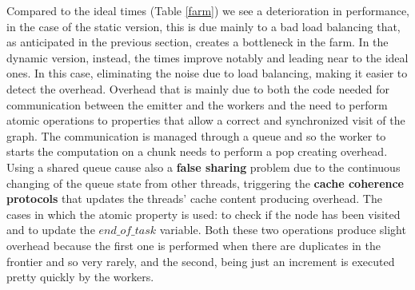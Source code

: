 Compared to the ideal times (Table \ref{farm}) we see a deterioration in performance, 
in the case of the static version, this is due mainly to a bad load balancing that, as anticipated in the previous section, creates a bottleneck in the farm. In the dynamic version, instead, the times improve notably and leading near to the ideal ones. In this case, eliminating the noise due to load balancing, making it easier to detect the overhead. Overhead that is mainly due to both the code needed for communication between the emitter and the workers and the need to perform atomic operations to properties that allow a correct and synchronized visit of the graph. The communication is managed through a queue and so the worker to starts the computation on a chunk needs to perform a pop creating overhead. Using a shared queue cause also a \textbf{false sharing} problem due to the continuous changing of the queue state from other threads, triggering the \textbf{cache coherence protocols} that updates the threads' cache content producing overhead. 
The cases in which the atomic property is used: to check if the node has been visited and to update the $end\_of\_task$ variable. Both these two operations produce slight overhead because the first one is performed when there are duplicates in the frontier and so very rarely, and the second, being just an increment is executed pretty quickly by the workers.
\newpage